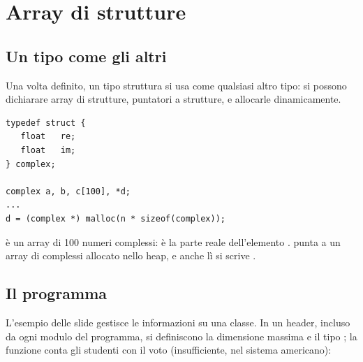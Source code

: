 
\section{Array di strutture}

\subsection{Un tipo come gli altri}

Una volta definito, un tipo struttura si usa come qualsiasi altro tipo: si
possono dichiarare array di strutture, puntatori a strutture, e allocarle
dinamicamente.

\begin{lstlisting}[style=c]
typedef struct {
   float   re;
   float   im;
} complex;

complex a, b, c[100], *d;
...
d = (complex *) malloc(n * sizeof(complex));
\end{lstlisting}

 è un array di 100 numeri complessi:  è la parte
reale dell'elemento .  punta a un array di  complessi
allocato nello heap, e anche lì si scrive .

\subsection{Il programma }

L'esempio delle slide gestisce le informazioni su una classe. In un header,
incluso da ogni modulo del programma, si definiscono la dimensione massima e
il tipo ; la funzione  conta gli studenti con il
voto  (insufficiente, nel sistema americano):


